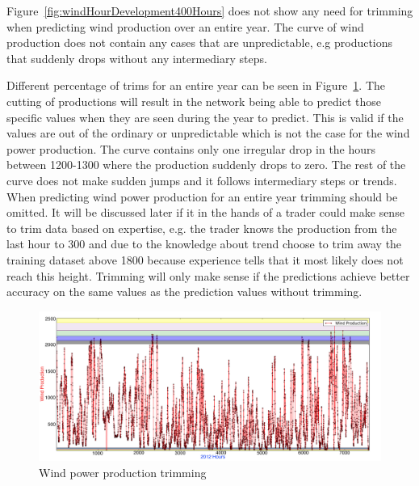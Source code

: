 Figure~\ref{fig:windHourDevelopment400Hours} does not show any need for trimming when predicting wind production over an entire year. The curve of wind production does not contain any cases that are unpredictable, e.g productions that suddenly drops without any intermediary steps. 

Different percentage of trims for an entire year can be seen in Figure~\ref{fig:windProductionTrimming}. The cutting of productions will result in the network being able to predict those specific values when they are seen during the year to predict. This is valid if the values are out of the ordinary or unpredictable which is not the case for the wind power production. The curve contains only one irregular drop in the hours between 1200-1300 where the production suddenly drops to zero. The rest of the curve does not make sudden jumps and it follows intermediary steps or trends. When predicting wind power production for an entire year trimming should be omitted. It will be discussed later if it in the hands of a trader could make sense to trim data based on expertise, e.g. the trader knows the production from the last hour to 300 and due to the knowledge about trend choose to trim away the training dataset above 1800 because experience tells that it most likely does not reach this height. Trimming will only make sense if the predictions achieve better accuracy on the same values as the prediction values without trimming.


\begin{figure}[H]
\centering
\includegraphics[width=0.99\linewidth,natwidth=898,natheight=587]{billeder/windProductionTrimming.jpg}
\caption{Wind power production trimming}
\label{fig:windProductionTrimming}
\end{figure}


